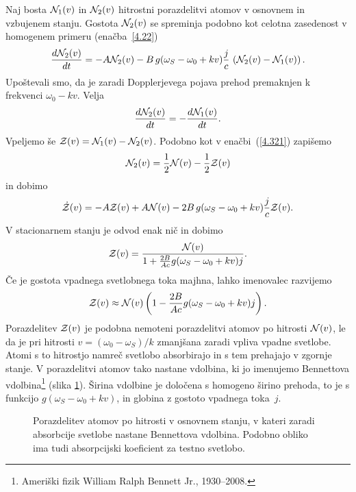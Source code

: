 Naj bosta ${\cal N}_{1}(v)$ in ${\cal N}_{2}(v)$ hitrostni porazdelitvi
atomov v osnovnem in vzbujenem stanju. Gostota
${\cal N}_{2}(v)$ se spreminja podobno kot celotna
zasedenost v homogenem primeru (enačba~\ref{4.22})
\begin{equation}
\frac{d{\cal N}_{2}(v)}{dt}=-A{\cal N}_{2}(v) -B\, g(\omega_S-\omega_{0}+kv)
\frac{j}{c}\,
\left({\cal N}_{2}(v)-{\cal N}_{1}(v)\right).
\label{4.85}
\end{equation}
Upoštevali smo, da je zaradi Dopplerjevega pojava prehod premaknjen k frekvenci
$\omega_{0}-kv$. Velja
\begin{equation}
 \frac{d{\cal N}_{2}(v)}{dt}=-\frac{d{\cal N}_{1}(v)}{dt}.
\label{4.86}
\end{equation}
Vpeljemo še ${\cal Z}(v)={\cal N}_{1}(v)-{\cal N}_{2}(v)$. Podobno kot 
v enačbi~(\ref{4.321}) zapišemo
\begin{equation}
{\cal N}_{2}(v)=\frac{1}{2}{\cal N}(v)-\frac{1}{2}{\cal Z}(v)
\end{equation}
in dobimo 
\begin{equation}
\dot{{\cal Z}}(v)=-A{\cal Z}(v)+A{\cal N}(v)
-2B\,g(\omega_S-\omega_{0}+kv)\frac{j}{c}
{\cal Z}(v).
\label{4.87}
\end{equation}
V stacionarnem stanju je odvod enak nič in dobimo
\begin{equation}
{\cal Z}(v)=\frac{{\cal N}(v)}{1+\frac{2B}{Ac}g(\omega_S-\omega_{0}+kv)j}.
\label{4.88}
\end{equation}
 Če je gostota vpadnega svetlobnega toka majhna, lahko imenovalec razvijemo
\begin{equation}
{\cal Z}(v)\approx{\cal N}(v)\left(1-\frac{2B}{Ac}g(\omega_S-\omega_{0}+kv)j\right).
\label{4.89}
\end{equation}
Porazdelitev ${\cal Z}(v)$ je podobna nemoteni porazdelitvi atomov
po hitrosti ${\cal N}(v)$, le da je pri hitrosti $v=(\omega_{0}-\omega_S)/k$
zmanjšana zaradi vpliva vpadne svetlobe. Atomi s to hitrostjo namreč svetlobo
absorbirajo in s tem prehajajo v zgornje stanje. V porazdelitvi
atomov tako nastane vdolbina, ki jo imenujemo
Bennettova vdolbina\footnote{Ameriški fizik William Ralph Bennett Jr., 1930--2008.} 
(slika \ref{fig:Bennet}). Širina vdolbine je določena
s homogeno širino prehoda, to je s funkcijo $g(\omega_S-\omega_{0}+kv)$, in 
globina  z gostoto vpadnega toka~$j$.
\begin{figure}[h]
\centering
\def\svgwidth{90truemm} 

\caption{Porazdelitev atomov po hitrosti v osnovnem stanju, v kateri zaradi
absorbcije svetlobe nastane Bennettova vdolbina. Podobno obliko ima 
tudi absorpcijski koeficient za testno svetlobo.}
\label{fig:Bennet}
\end{figure}

